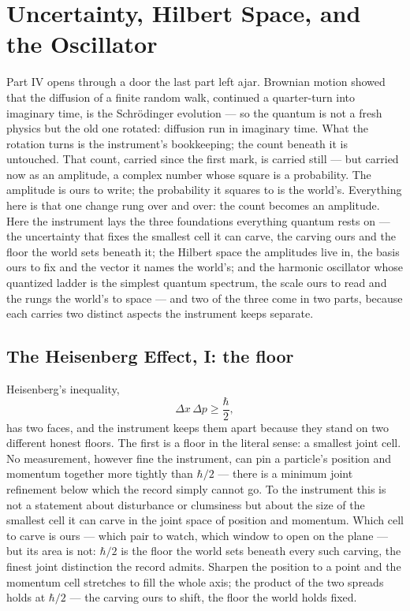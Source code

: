 \chapter{Uncertainty, Hilbert Space, and the Oscillator}
\label{chap:uncertainty-hilbert-oscillator}

Part IV opens through a door the last part left ajar. Brownian motion showed that the diffusion of a finite
random walk, continued a quarter-turn into imaginary time, is the Schr\"odinger evolution --- so the quantum
is not a fresh physics but the old one rotated: diffusion run in imaginary time. What the rotation turns is the
instrument's bookkeeping; the count beneath it is untouched. That count, carried since the first mark, is
carried still --- but carried now as an amplitude, a complex number whose square is a probability. The
amplitude is ours to write; the probability it squares to is the world's. Everything here is that one change
rung over and over: the count becomes an amplitude. Here the instrument lays the three foundations everything
quantum rests on --- the uncertainty that fixes the smallest cell it can carve, the carving ours and the floor
the world sets beneath it; the Hilbert space the amplitudes live in, the basis ours to fix and the vector it
names the world's; and the harmonic oscillator whose quantized ladder is the simplest quantum spectrum, the
scale ours to read and the rungs the world's to space --- and two of the three come in two parts, because each
carries two distinct aspects the instrument keeps separate.

\section{The Heisenberg Effect, I: the floor}
\label{se:heisenberg-floor}

Heisenberg's inequality,
\begin{equation}
  \Delta x\,\Delta p \ge \frac{\hbar}{2},
\end{equation}
has two faces, and the instrument keeps them apart because they stand on two different honest floors. The
first is a floor in the literal sense: a smallest joint cell. No measurement, however fine the instrument,
can pin a particle's position and momentum together more tightly than $\hbar/2$ --- there is a minimum joint
refinement below which the record simply cannot go. To the instrument this is not a statement about
disturbance or clumsiness but about the size of the smallest cell it can carve in the joint space of position
and momentum. Which cell to carve is ours --- which pair to watch, which window to open on the plane --- but
its area is not: $\hbar/2$ is the floor the world sets beneath every such carving, the finest joint
distinction the record admits. Sharpen the position to a point and the momentum cell stretches to fill the
whole axis; the product of the two spreads holds at $\hbar/2$ --- the carving ours to shift, the floor the
world holds fixed.

